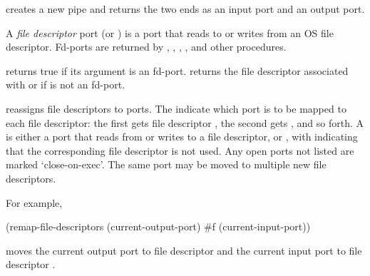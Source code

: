 
%


\begin{protos}
\end{protos}
\noindent
{} creates a new pipe and returns the two ends as an
 input port and an output port.


A {\em file descriptor} port (or )
 is a port that reads to or writes from an OS file descriptor.
Fd-ports are returned by , ,
 , , and other procedures.

\begin{protos}
\end{protos}
\noindent
{} returns true if its argument is an fd-port.
 returns the file descriptor associated with 
 or  if  is not an fd-port.

\begin{protos}
\end{protos}
\noindent
{} reassigns file descriptors to ports.
The  indicate which port is to be mapped to each
 file descriptor: the first gets file descriptor , the second gets
 , and so forth.
A  is either a port that reads from or writes to
 a file descriptor,
 or , with  indicating that the corresponding file
 descriptor is not used.
Any open ports not listed are marked `close-on-exec'.
The same port may be moved to multiple new file descriptors.

For example,
\begin{example}
(remap-file-descriptors (current-output-port)
                        \#f
                        (current-input-port))
\end{example}
moves the current output port to file descriptor  and the
current input port to file descriptor .

